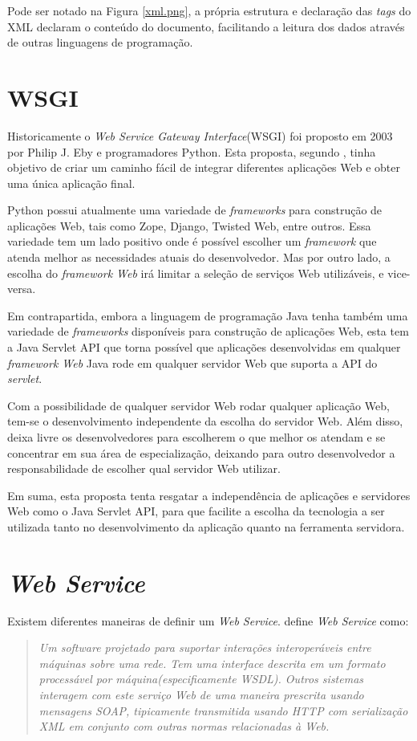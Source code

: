Pode ser notado na Figura \ref{xml.png}, a própria estrutura e declaração das \textit{tags} do XML declaram o conteúdo do documento, facilitando a leitura dos dados através de outras linguagens de programação.

\section{WSGI}
\label{wsgi}
Historicamente o \textit{Web Service Gateway Interface}(WSGI) foi proposto em 2003 por Philip J. Eby e programadores Python. Esta proposta, segundo \cite{wsgi:website}, tinha objetivo de criar um caminho fácil de integrar diferentes aplicações Web e obter uma única aplicação final.

Python possui atualmente uma variedade de \textit{frameworks} para construção de aplicações Web, tais como Zope, Django, Twisted Web, entre outros. Essa variedade tem um lado positivo onde é possível escolher um \textit{framework} que atenda melhor as necessidades atuais do desenvolvedor. Mas por outro lado, a escolha do \textit{framework Web} irá limitar a seleção de serviços Web utilizáveis, e vice-versa.

Em contrapartida, embora a linguagem de programação Java tenha também uma variedade de \textit{frameworks} disponíveis para construção de aplicações Web, esta tem a Java Servlet API que torna possível que aplicações desenvolvidas em qualquer \textit{framework Web} Java rode em qualquer servidor Web que suporta a API do \textit{servlet}.

Com a possibilidade de qualquer servidor Web rodar qualquer aplicação Web, tem-se o desenvolvimento independente da escolha do servidor Web. Além disso, deixa livre os desenvolvedores para escolherem o que melhor os atendam e se concentrar em sua área de especialização, deixando para outro desenvolvedor a responsabilidade de escolher qual servidor Web utilizar.

Em suma, esta proposta tenta resgatar a independência de aplicações e servidores Web como o Java Servlet API, para que facilite a escolha da tecnologia a ser utilizada tanto no desenvolvimento da aplicação quanto na ferramenta servidora.

\section{\textit{Web Service}}

Existem diferentes maneiras de definir um \textit{Web Service}.   define \textit{Web Service} como:
\begin{quote}
\textit{Um software projetado para suportar interações interoperáveis entre máquinas sobre uma rede. Tem uma interface descrita em um formato processável por máquina(especificamente WSDL). Outros sistemas interagem com este serviço Web de uma maneira prescrita usando mensagens SOAP, tipicamente transmitida usando HTTP com serialização XML em conjunto com outras normas relacionadas à Web.}
\end{quote}

